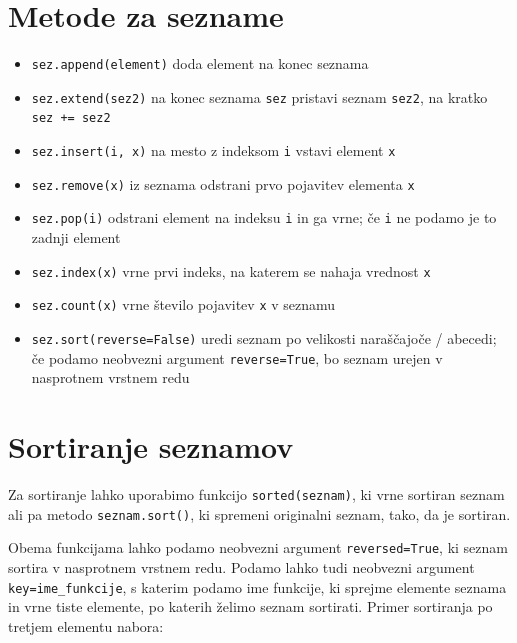 \documentclass[
]{book}
\providecommand{\tightlist}{%
  \setlength{\itemsep}{0pt}\setlength{\parskip}{0pt}}
\begin{document}
\hypertarget{metode-za-sezname}{%
\section{Metode za sezname}\label{metode-za-sezname}}

\begin{itemize}
\tightlist
\item
  \texttt{sez.append(element)} doda element na konec seznama
\item
  \texttt{sez.extend(sez2)} na konec seznama \texttt{sez} pristavi seznam \texttt{sez2}, na kratko \texttt{sez\ +=\ sez2}
\item
  \texttt{sez.insert(i,\ x)} na mesto z indeksom \texttt{i} vstavi element \texttt{x}
\item
  \texttt{sez.remove(x)} iz seznama odstrani prvo pojavitev elementa \texttt{x}
\item
  \texttt{sez.pop(i)} odstrani element na indeksu \texttt{i} in ga vrne; če \texttt{i} ne podamo je to zadnji element
\item
  \texttt{sez.index(x)} vrne prvi indeks, na katerem se nahaja vrednost \texttt{x}
\item
  \texttt{sez.count(x)} vrne število pojavitev \texttt{x} v seznamu
\item
  \texttt{sez.sort(reverse=False)} uredi seznam po velikosti naraščajoče / abecedi; če podamo neobvezni argument \texttt{reverse=True}, bo seznam urejen v nasprotnem vrstnem redu
\end{itemize}

\hypertarget{sortiranje-seznamov}{%
\section{Sortiranje seznamov}\label{sortiranje-seznamov}}

Za sortiranje lahko uporabimo funkcijo \texttt{sorted(seznam)}, ki vrne sortiran seznam ali pa metodo \texttt{seznam.sort()}, ki spremeni originalni seznam, tako, da je sortiran.

Obema funkcijama lahko podamo neobvezni argument \texttt{reversed=True}, ki seznam sortira v nasprotnem vrstnem redu. Podamo lahko tudi neobvezni argument \texttt{key=ime\_funkcije}, s katerim podamo ime funkcije, ki sprejme elemente seznama in vrne tiste elemente, po katerih želimo seznam sortirati. Primer sortiranja po tretjem elementu nabora:
\end{document}
